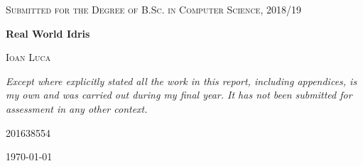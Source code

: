 \documentclass[a4paper, 12pt, oneside]{report}
\begin{document}
\begin{titlepage}
	\centering
	{\scshape\LARGE Submitted for the Degree of B.Sc. in Computer Science, 2018/19 \par}
	\vspace{1cm}
	{\huge\bfseries Real World Idris\par}
	\vspace{1.5cm}
	{\scshape\Large Ioan Luca \par}
	\vspace{2cm}
	{\Large\itshape Except where explicitly stated all the work in this report, including appendices, is my own and was carried out during my final year. It has not been submitted for assessment in any other context.\par}
	\vfill
	201638554 

	\vfill

	{\large \today\par}
\end{titlepage}




\begin{abstract} 
Idris is a general purpose, dependently typed programming language that has an
advanced type system which encodes complex properties about programs into
types, which means that the compiler checks the programs for correctness
before they run.

Idris is at the forefront of a new generation of programming languages
that support “lightweight verification” --- specifications are defined
early during development, enabling writing maintainable code that is
guaranteed to work.
This has the potential to drastically reduce the costs of reliable software by
integrating verification into development, instead of considering it a separate
concern.

``Real World Idris'' aims to upgrade the Idris ecosystem
with a Foreign Function Interface (FFI) to OCaml.
The idea is to enable the two-way interoperability between these two
languages.

This would essentially allow Idris programs to access the mature OCaml
library ecosystem, which would ultimately make Idris more suitable
for practical programming.
\end{abstract}
\end{document}
